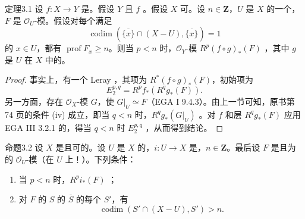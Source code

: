 \begin{SGAresult}{定理}{3.1}
设 $f:X\to Y$ 是。假设 $Y$ 且 $f$ 。假设 $X$ 可。设 $n\in\mathbf Z$，$U$ 是 $X$ 的一个，$F$ 是 $\mathscr O_U$-模。假设对每个满足
\[\operatorname{codim}(\overline{\{x\}}\cap(X-U),\overline{\{x\}})=1\]
的 $x\in U$，都有 $\operatorname{prof}F_x\geq n$。则当 $p<n$ 时，$\mathscr O_Y$-模 $R^p(f\circ g)_*(F)$ ，其中 $g$ 是 $U$ 在 $X$ 中的。
\end{SGAresult}
\begin{proof}
事实上，有一个 Leray ，其项为 $R^*(f\circ g)_*(F)$，初始项为
\[E^{p,q}_2=R^pf_*(R^qg_*(F)).\]
另一方面，存在 $\mathscr O_X$-模 $G$，使 $G|_U\simeq F$（EGA I 9.4.3）。由上一节可知，原书第 74 页的条件 (iv) 成立，即当 $q<n$ 时，$R^qg_*(G|_U)$ 。对 $f$ 和层 $R^qg_*(F)$ 应用 EGA III 3.2.1 的，得当 $q<n$ 时 $E^{p,q}_2$ ，从而得到结论。
\end{proof}
\begin{SGAresult}{命题}{3.2}
设 $X$ 是且可的。设 $U$ 是 $X$ 的，$i:U\to X$ 是，$n\in\mathbf Z$。最后设 $F$ 是且为  的 $\mathscr O_U$-模（在 $U$ 上！）。下列条件：
\begin{enumerate}
\item[(a)] 当 $p<n$ 时，$R^pi_*(F)$ ；
\item[(b)] 对 $F$ 的 $S$ 的 $\overline S$ 的每个 $S'$，有
\[\operatorname{codim}(S'\cap(X-U),S')>n.\]
\end{enumerate}
\end{SGAresult}
